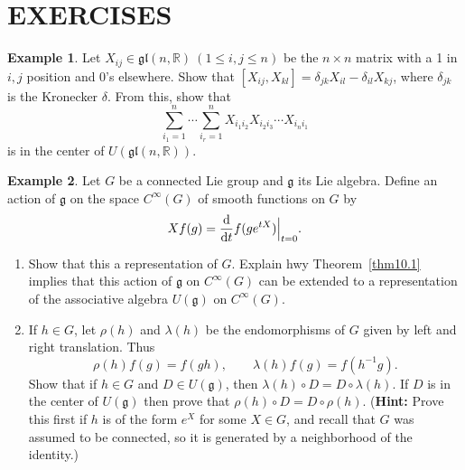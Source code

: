 \documentclass[12pt,reqno]{book}%
\theoremstyle{definition}
\newtheorem{example}{Example}[chapter]
\theoremstyle{remark}
\theoremstyle{theorem}
\theoremstyle{remark}
\begin{document}
\section*{EXERCISES}%
\begin{example}\label{}
    Let $X_{ij} \in \mathfrak{gl}(n, \mathbb{R}) \ (1 \leq i, j \leq n)$ be the $n \times n$ matrix with a 1 in $i, j$ position and 0's elsewhere.
    Show that $[X_{ij}, X_{kl}] = \delta_{jk}X_{il} - \delta_{il}X_{kj}$, where $\delta_{jk}$ is the Kronecker $\delta$.
    From this, show that
    \[
        \sum_{i_1 = 1}^{n} \cdots \sum_{i_r = 1}^{n} X_{i_1i_2} X_{i_2i_3} \cdots X_{i_ni_1}
    \]
    is in the center of $U(\mathfrak{gl}(n, \mathbb{R}))$.
\end{example}

\begin{example}\label{}
    Let $G$ be a connected Lie group and $\mathfrak{g}$ its Lie algebra.
    Define an action of $\mathfrak{g}$ on the space $C^\infty(G)$ of smooth functions on $G$ by
    \[
        Xf(g) = \dv{t}f(ge^{tX})\Big|_{t = 0}.
    \]
    \begin{enumerate}[label=(\roman*),font=\normalfont,before=\normalfont]
        \item Show that this a representation of $G$.
            Explain hwy Theorem~\ref{thm10.1} implies that this action of $\mathfrak{g}$ on $C^\infty(G)$ can be extended to a representation of the associative algebra $U(\mathfrak{g})$ on $C^{\infty}(G)$.
        \item If $h \in G$, let $\rho(h)$ and $\lambda(h)$ be the endomorphisms of $G$ given by left and right translation.
            Thus
            \[
                \rho(h)f(g) = f(gh), \qquad \lambda(h)f(g) = f(h^{-1}g).
            \]
            Show that if $h \in G$ and $D \in U(\mathfrak{g})$, then $\lambda(h) \circ D = D \circ \lambda(h)$.
            If $D$ is in the center of $U(\mathfrak{g})$ then prove that $\rho(h) \circ D = D \circ \rho(h)$.
            (\textbf{Hint:} Prove this first if $h$ is of the form $e^X$ for some $X \in G$, and recall that $G$ was assumed to be connected, so it is generated by a neighborhood of the identity.)
    \end{enumerate}
\end{example}
\end{document}
